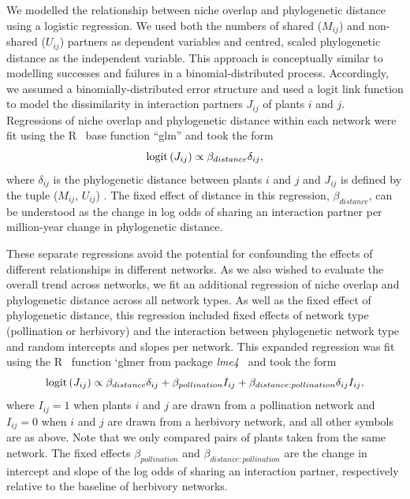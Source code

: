\documentclass[12pt]{article}
\begin{document}
\begin{spacing}{1.5}
    We modelled the relationship between niche overlap and phylogenetic 
    distance using a logistic regression. We used both the numbers of shared 
    ($M_{ij}$) and non-shared ($U_{ij}$) partners as dependent variables and 
    centred, scaled phylogenetic distance as the independent variable. This 
    approach is conceptually similar to modelling successes and failures in a 
    binomial-distributed process. Accordingly, we assumed a binomially-distributed error structure and used a logit link function to model the dissimilarity in interaction partners 
    $J_{ij}$ of plants $i$ and $j$. Regressions of niche overlap and 
    phylogenetic distance within 
    each network were fit using the R~\citep{R} base function ``glm'' and 
    took the form
      \begin{equation}
        {\rm logit}\left(J_{ij}\right) \propto \beta_{distance}\delta_{ij} ,
        \label{basic}
      \end{equation}
    where $\delta_{ij}$ is the phylogenetic distance between plants $i$ and 
    $j$ and $J_{ij}$ is defined by the tuple ($M_{ij}$, $U_{ij}$) . 
    The fixed effect of distance in this regression, $\beta_{distance}$, 
    can be understood as the change in log odds of sharing an interaction 
    partner per million-year change in phylogenetic distance. 


    These separate regressions avoid the potential for confounding the effects
    of different relationships in different networks. As we also wished to 
    evaluate the overall trend across networks, we fit an additional
    regression of niche overlap and phylogenetic distance across all network 
    types. As well as the fixed effect of phylogenetic distance, this 
    regression included fixed effects of network type (pollination or 
    herbivory) and the interaction between phylogenetic network type and 
    random intercepts and slopes per network. This expanded regression was fit
    using the R~\citep{R} function `glmer from package 
    \emph{lme4}~\citep{lme4} and took the form
      \begin{equation}
        {\rm logit}\left(J_{ij}\right) \propto \beta_{distance} \delta_{ij} + \beta_{pollination} I_{ij} + \beta_{distance:pollination} \delta_{ij} I_{ij} ,
      \end{equation}
    where $I_{ij}=1$ when plants $i$ and $j$ are drawn from a 
    pollination network and $I_{ij}=0$ when $i$ and $j$ are drawn from a herbivory network, and all other symbols 
    are as above. Note that we only compared pairs of plants taken from the 
    same network. The fixed effects $\beta_{pollination}$ and $\beta_{distance:pollination}$ 
    are the change in intercept and slope of the log odds of sharing an 
    interaction partner, respectively relative to the baseline of 
    herbivory networks.



\end{spacing}
\end{document}
